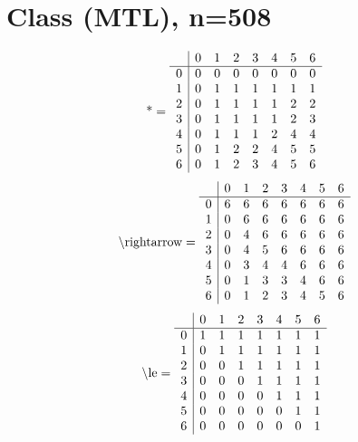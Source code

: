 \documentclass[11pt]{article}
\begin{document}
\section{Class (MTL), n=508}
\[\text{*} = 
\begin{array}{r | r r r r r r r}
 & 0 & 1 & 2 & 3 & 4 & 5 & 6 \\ \hline
0 & 0 & 0 & 0 & 0 & 0 & 0 & 0 \\
1 & 0 & 1 & 1 & 1 & 1 & 1 & 1 \\
2 & 0 & 1 & 1 & 1 & 1 & 2 & 2 \\
3 & 0 & 1 & 1 & 1 & 1 & 2 & 3 \\
4 & 0 & 1 & 1 & 1 & 2 & 4 & 4 \\
5 & 0 & 1 & 2 & 2 & 4 & 5 & 5 \\
6 & 0 & 1 & 2 & 3 & 4 & 5 & 6 \\
\end{array}
\]
\[\text{\textbackslash rightarrow} = 
\begin{array}{r | r r r r r r r}
 & 0 & 1 & 2 & 3 & 4 & 5 & 6 \\ \hline
0 & 6 & 6 & 6 & 6 & 6 & 6 & 6 \\
1 & 0 & 6 & 6 & 6 & 6 & 6 & 6 \\
2 & 0 & 4 & 6 & 6 & 6 & 6 & 6 \\
3 & 0 & 4 & 5 & 6 & 6 & 6 & 6 \\
4 & 0 & 3 & 4 & 4 & 6 & 6 & 6 \\
5 & 0 & 1 & 3 & 3 & 4 & 6 & 6 \\
6 & 0 & 1 & 2 & 3 & 4 & 5 & 6 \\
\end{array}
\]
\[\text{\textbackslash le} = 
\begin{array}{r | r r r r r r r}
 & 0 & 1 & 2 & 3 & 4 & 5 & 6 \\ \hline
0 & 1 & 1 & 1 & 1 & 1 & 1 & 1 \\
1 & 0 & 1 & 1 & 1 & 1 & 1 & 1 \\
2 & 0 & 0 & 1 & 1 & 1 & 1 & 1 \\
3 & 0 & 0 & 0 & 1 & 1 & 1 & 1 \\
4 & 0 & 0 & 0 & 0 & 1 & 1 & 1 \\
5 & 0 & 0 & 0 & 0 & 0 & 1 & 1 \\
6 & 0 & 0 & 0 & 0 & 0 & 0 & 1 \\
\end{array}
\]
\end{document}
